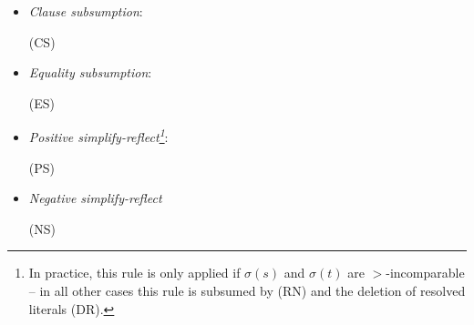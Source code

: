 \documentclass{report}
\begin{document}
\begin{definition}
\begin{itemize}
{     \medskip
     (RP')  {
       \phantom{ae}  \vee R} {if
       $u|_p = \sigma(s)$, $\sigma(s)>\sigma(t)$ and
       if  is not eligible for
       paramodulation or $u \not> v$ or $p \not=
       \lambda$ or $\sigma$ is not a variable renaming.}

     \medskip \noindent This stronger rule is implemented successfully
     by both E and
     SPASS~\cite{Weidenbach:personal-99}.}:

   \bigskip (RP) 
   { \phantom{ae}  \vee
     R} {if $u|_p = \sigma(s)$, $\sigma(s)>\sigma(t)$, and if
      is not eligible for paramodulation or $v > u$ or $p
     \not= \lambda$.}

 \item \emph{Clause subsumption}:

   \bigskip (CS) 

 \item \emph{Equality subsumption}:

   \bigskip (ES) 

 \item \emph{Positive simplify-reflect\footnote{In
       practice, this rule is only applied if $\sigma(s)$ and
       $\sigma(t)$ are $>$-incomparable -- in all other cases this
       rule is subsumed by (RN) and the deletion of resolved literals
       (DR).}}:

   \bigskip (PS) 


 \item \emph{Negative simplify-reflect}

   \bigskip (NS) 

%



\end{itemize}
\end{definition}
\end{document}
